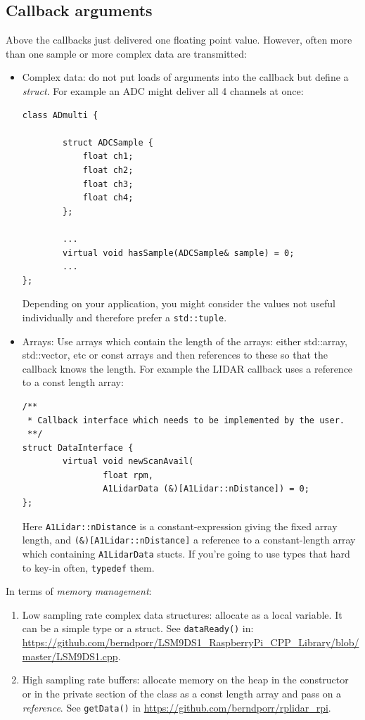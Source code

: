 \documentclass[12pt]{report}
\begin{document}
\subsection{Callback arguments}
Above the callbacks just delivered one floating point value. However,
often more than one sample or more complex data are transmitted:
\begin{itemize}
\item Complex data: do not put loads of arguments into the
  callback but define a \textsl{struct}. For example an ADC might
  deliver all 4 channels at once:
\begin{verbatim}
class ADmulti {

        struct ADCSample {
            float ch1;
            float ch2;
            float ch3;
            float ch4;
        };

        ...
        virtual void hasSample(ADCSample& sample) = 0;
        ...
};
\end{verbatim}
Depending on your application,
you might consider the values not useful individually and therefore prefer
a \texttt{std::tuple}.
\item Arrays: Use arrays which contain the length of the arrays:
  either std::array, std::vector, etc or const arrays and then
  references to these so that the callback knows the length.
  For example the LIDAR callback uses a reference to a const length
  array:
\begin{verbatim}
/**
 * Callback interface which needs to be implemented by the user.
 **/
struct DataInterface {
        virtual void newScanAvail(
                float rpm, 
                A1LidarData (&)[A1Lidar::nDistance]) = 0;
};
\end{verbatim}
Here \texttt{A1Lidar::nDistance} is a constant-expression giving the fixed array length,
and \texttt{(\&)[A1Lidar::nDistance]} a reference to a constant-length array which
containing \texttt{A1LidarData} stucts. If you're going to use types that hard to key-in
often, \texttt{typedef} them.
\end{itemize}
In terms of \textsl{memory management}:
\begin{enumerate}
\item Low sampling rate complex data structures: allocate as a local variable. It can be a simple type
  or a struct. See \texttt{dataReady()} in: \url{https://github.com/berndporr/LSM9DS1_RaspberryPi_CPP_Library/blob/master/LSM9DS1.cpp}.
\item High sampling rate buffers: allocate memory on the heap in the
  constructor or in the private section of the class as a const length
  array and pass on a \textsl{reference}. See \texttt{getData()} in
  \url{https://github.com/berndporr/rplidar_rpi}.
\end{enumerate}
\end{document}
